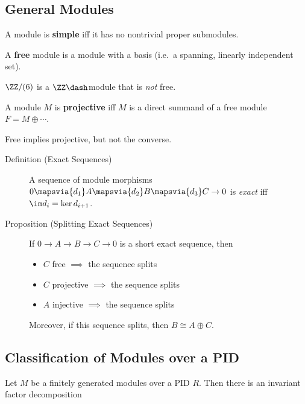 \hypertarget{general-modules}{%
\subsection{General Modules}\label{general-modules}}

\begin{description}
\tightlist
\item[Definition (Simple Module)]
A module is \textbf{simple} iff it has no nontrivial proper submodules.
\item[Definition (Free Module)]
A \textbf{free} module is a module with a basis (i.e.~a spanning,
linearly independent set).
\item[Example]
\(\ZZ/(6)\) is a \(\ZZ\dash\)module that is \emph{not} free.
\item[Definition (Projective Module)]
A module \(M\) is \textbf{projective} iff \(M\) is a direct summand of a
free module \(F = M \oplus \cdots\).
\end{description}

Free implies projective, but not the converse.

\begin{description}
\item[Definition (Exact Sequences)]
A sequence of module morphisms
\(0 \mapsvia{d_1} A \mapsvia{d_2} B \mapsvia{d_3} C \to 0\) is
\emph{exact} iff \(\im d_i = \ker d_{i+1}\).
\item[Proposition (Splitting Exact Sequences)]
If \(0 \to A \to B \to C \to 0\) is a short exact sequence, then

\begin{itemize}
\tightlist
\item
  \(C\) free \(\implies\) the sequence splits
\item
  \(C\) projective \(\implies\) the sequence splits
\item
  \(A\) injective \(\implies\) the sequence splits
\end{itemize}

Moreover, if this sequence splits, then \(B \cong A \oplus C\).
\end{description}

\hypertarget{classification-of-modules-over-a-pid}{%
\subsection{Classification of Modules over a
PID}\label{classification-of-modules-over-a-pid}}

Let \(M\) be a finitely generated modules over a PID \(R\). Then there
is an invariant factor decomposition

